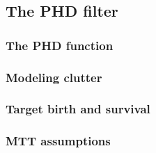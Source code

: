 \subsection{The PHD filter}

\subsubsection{The PHD function}

\subsubsection{Modeling clutter}

\subsubsection{Target birth and survival}

\subsubsection{MTT assumptions}